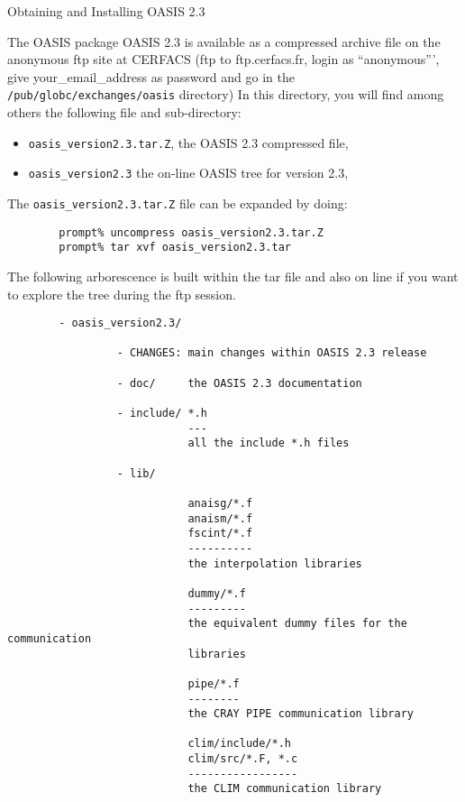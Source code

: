 \newpage
\begin{section}{Obtaining and Installing OASIS 2.3}
%
\begin{subsection}{The OASIS package}
OASIS 2.3 is available as a compressed archive file on the anonymous ftp site
at CERFACS
(ftp to ftp.cerfacs.fr, login as ``anonymous''', give your\_email\_address as
password and go in the {\tt /pub/globc/exchanges/oasis} directory)
In this directory, you will find among others the following file and 
sub-directory:
\begin{itemize}
\item {\tt oasis\_version2.3.tar.Z}, the OASIS 2.3 compressed file,
\item {\tt oasis\_version2.3} the on-line OASIS tree for version 2.3,
\end{itemize}
The {\tt oasis\_version2.3.tar.Z} file can be expanded by doing:
\begin{verbatim}
        prompt% uncompress oasis_version2.3.tar.Z
        prompt% tar xvf oasis_version2.3.tar
\end{verbatim}
The following arborescence is built within the tar file and also
on line if you want to explore the tree during the ftp session.
\begin{verbatim}
        - oasis_version2.3/

                 - CHANGES: main changes within OASIS 2.3 release

                 - doc/     the OASIS 2.3 documentation 

                 - include/ *.h 
                            ---
                            all the include *.h files

                 - lib/     

                            anaisg/*.f
                            anaism/*.f
                            fscint/*.f
                            ----------
                            the interpolation libraries

                            dummy/*.f
                            ---------
                            the equivalent dummy files for the communication 
                            libraries

                            pipe/*.f
                            --------
                            the CRAY PIPE communication library

                            clim/include/*.h
                            clim/src/*.F, *.c
                            -----------------
                            the CLIM communication library
                        

\end{verbatim}
\end{subsection}
\end{section}
